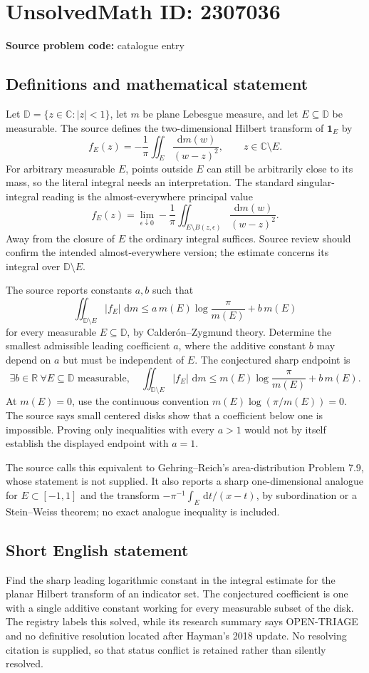 \documentclass[11pt]{article}
\newcommand{\R}{\mathbb{R}}
\newcommand{\C}{\mathbb{C}}
\newcommand{\dd}{\,\mathrm{d}}
\begin{document}
\section*{UnsolvedMath ID: 2307036}
\textbf{Source problem code:} catalogue entry
\subsection{Definitions and mathematical statement}
Let $\mathbb D=\{z\in\C:|z|<1\}$, let $m$ be plane Lebesgue measure, and let $E\subseteq\mathbb D$ be measurable. The source defines the two-dimensional Hilbert transform of $\mathbf1_E$ by
\[
 f_E(z)=-\frac1\pi\iint_E\frac{\dd m(w)}{(w-z)^2},\qquad z\in\C\setminus E.
\]
For arbitrary measurable $E$, points outside $E$ can still be arbitrarily close to its mass, so the literal integral needs an interpretation. The standard singular-integral reading is the almost-everywhere principal value
\[
 f_E(z)=\lim_{\epsilon\downarrow0}-\frac1\pi
 \iint_{E\setminus B(z,\epsilon)}\frac{\dd m(w)}{(w-z)^2}.
\]
Away from the closure of $E$ the ordinary integral suffices. Source review should confirm the intended almost-everywhere version; the estimate concerns its integral over $\mathbb D\setminus E$.

The source reports constants $a,b$ such that
\[
 \iint_{\mathbb D\setminus E}|f_E|\,\dd m
 \leq a\,m(E)\log\frac\pi{m(E)}+b\,m(E)
\]
for every measurable $E\subseteq\mathbb D$, by Calderón--Zygmund theory. Determine the smallest admissible leading coefficient $a$, where the additive constant $b$ may depend on $a$ but must be independent of $E$. The conjectured sharp endpoint is
\[
 \exists b\in\R\ \forall E\subseteq\mathbb D\text{ measurable},\quad
 \iint_{\mathbb D\setminus E}|f_E|\,\dd m
 \leq m(E)\log\frac\pi{m(E)}+b\,m(E).
\]
At $m(E)=0$, use the continuous convention $m(E)\log(\pi/m(E))=0$. The source says small centered disks show that a coefficient below one is impossible. Proving only inequalities with every $a>1$ would not by itself establish the displayed endpoint with $a=1$.

The source calls this equivalent to Gehring--Reich's area-distribution Problem 7.9, whose statement is not supplied. It also reports a sharp one-dimensional analogue for $E\subset[-1,1]$ and the transform $-\pi^{-1}\int_E\dd t/(x-t)$, by subordination or a Stein--Weiss theorem; no exact analogue inequality is included.
\subsection{Short English statement}
Find the sharp leading logarithmic constant in the integral estimate for the planar Hilbert transform of an indicator set. The conjectured coefficient is one with a single additive constant working for every measurable subset of the disk. The registry labels this solved, while its research summary says OPEN-TRIAGE and no definitive resolution located after Hayman's 2018 update. No resolving citation is supplied, so that status conflict is retained rather than silently resolved.
\end{document}
